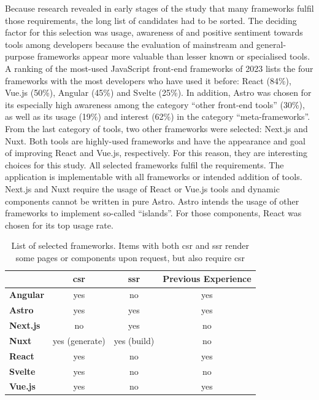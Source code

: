 \documentclass[a4paper, 12pt]{article}
\begin{document}
Because research revealed in early stages of the study that many frameworks fulfil those requirements, the long list of candidates had to be sorted.
The deciding factor for this selection was usage, awareness of and positive sentiment towards tools among developers because the evaluation of mainstream and general-purpose frameworks appear more valuable than lesser known or specialised tools.
A ranking of the most-used JavaScript front-end frameworks of 2023 \citep{stateOfJs2023} lists the four frameworks with the most developers who have used it before: React (84\%), Vue.js (50\%), Angular (45\%) and Svelte (25\%).
In addition, Astro was chosen for its especially high awareness among the category \enquote{other front-end tools} (30\%), as well as its usage (19\%) and interest (62\%) in the category \enquote{meta-frameworks}.
From the last category of tools, two other frameworks were selected: Next.js and Nuxt.
Both tools are highly-used frameworks and have the appearance and goal of improving React and Vue.js, respectively.
For this reason, they are interesting choices for this study.
All selected frameworks fulfil the requirements.
The application is implementable with all frameworks or intended addition of tools.
Next.js and Nuxt require the usage of React or Vue.js tools and dynamic components cannot be written in pure Astro. %
Astro intends the usage of other frameworks to implement so-called \enquote{islands}.
For those components, React was chosen for its top usage rate.

\begin{table}[h!]
  \begin{center}
    \begin{tabular}[h]{l c c c }
      ~       & \textbf{\acrshort{csr}} & \textbf{\acrshort{ssr}} & \textbf{Previous Experience} \\ \hline
      \textbf{Angular}  & yes & no & yes \\ \hline
      \textbf{Astro}    & yes & yes & yes \\ \hline
      \textbf{Next.js}  & no & yes & no \\ \hline
      \textbf{Nuxt}     & yes (generate) & yes (build) & no \\ \hline
      \textbf{React}    & yes & no & yes \\ \hline
      \textbf{Svelte}   & yes & no & no \\ \hline
      \textbf{Vue.js}   & yes & no & yes \\ 
    \end{tabular}
  \end{center}
  \caption{List of selected frameworks. Items with both \acrfull{csr} and \acrfull{ssr} render some pages or components upon request, but also require \acrfull{csr}}
  \label{tab:frameworks}
\end{table}
\end{document}
